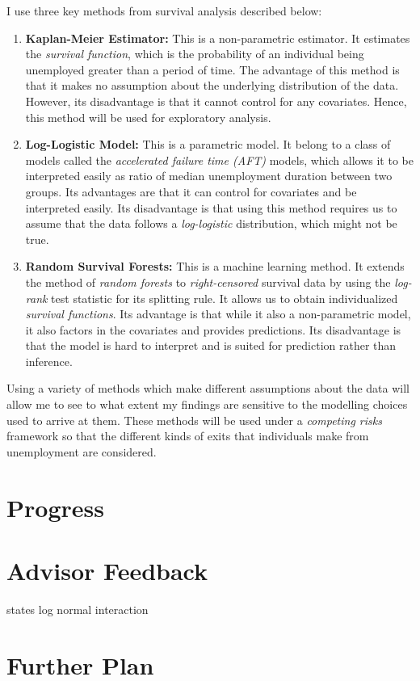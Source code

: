 \documentclass{article}
\begin{document}
I use three key methods from survival analysis described below:

\begin{enumerate}
    \item \textbf{Kaplan-Meier Estimator:} This is a non-parametric estimator. It estimates the \textit{survival function}, which is the probability of an individual being unemployed greater than a period of time. The advantage of this method is that it makes no assumption about the underlying distribution of the data. However, its disadvantage is that it cannot control for any covariates. Hence, this method will be used for exploratory analysis.

    \item \textbf{Log-Logistic Model:} This is a parametric model. It belong to a class of models called the \textit{accelerated failure time (AFT)} models, which allows it to be interpreted easily as ratio of median unemployment duration between two groups. Its advantages are that it can control for covariates and be interpreted easily. Its disadvantage is that using this method requires us to assume that the data follows a \textit{log-logistic} distribution, which might not be true.

    \item \textbf{Random Survival Forests:} This is a machine learning method. It extends the method of \textit{random forests} to \textit{right-censored} survival data by using the \textit{log-rank} test statistic for its splitting rule. It allows us to obtain individualized \textit{survival functions}. Its advantage is that while it also a non-parametric model, it also factors in the covariates and provides predictions. Its disadvantage is that the model is hard to interpret and is suited for prediction rather than inference.
    
\end{enumerate}

Using a variety of methods which make different assumptions about the data will allow me to see to what extent my findings are sensitive to the modelling choices used to arrive at them. These methods will be used under a \textit{competing risks} framework so that the different kinds of exits that individuals make from unemployment are considered.

\section{Progress}



\section{Advisor Feedback}

states log normal interaction

\section{Further Plan}

\printbibliography
\end{document}
